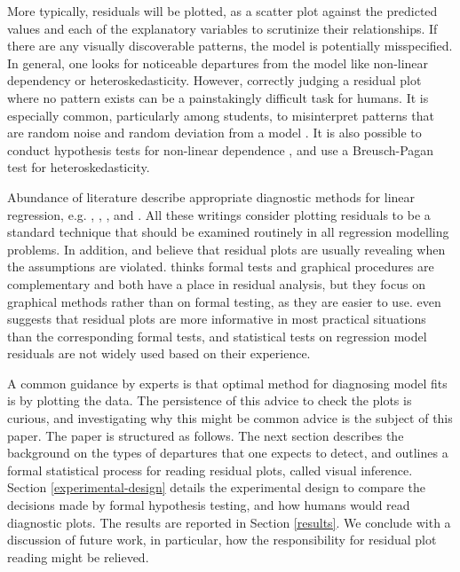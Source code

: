 \documentclass[]{interact}
\theoremstyle{plain}%
\theoremstyle{definition}
\theoremstyle{remark}
\begin{document}
More typically, residuals will be plotted, as a scatter plot against the
predicted values and each of the explanatory variables to scrutinize
their relationships. If there are any visually discoverable patterns,
the model is potentially misspecified. In general, one looks for
noticeable departures from the model like non-linear dependency or
heteroskedasticity. However, correctly judging a residual plot where no
pattern exists can be a painstakingly difficult task for humans. It is
especially common, particularly among students, to misinterpret patterns
that are random noise and random deviation from a model
\citep{loy2021bringing}. It is also possible to conduct hypothesis tests
for non-linear dependence \citep{ramsey_tests_1969}, and use a
Breusch-Pagan test \citep{breusch_simple_1979} for heteroskedasticity.

Abundance of literature describe appropriate diagnostic methods for
linear regression, e.g. \citet{draper1998applied},
\citet{montgomery1982introduction}, \citet{belsley_regression_1980},
\citet{cook_applied_1999} and \citet{cook1982residuals}. All these
writings consider plotting residuals to be a standard technique that
should be examined routinely in all regression modelling problems. In
addition, \citet{draper1998applied} and \citet{belsley_regression_1980}
believe that residual plots are usually revealing when the assumptions
are violated. \citet{cook_applied_1999} thinks formal tests and
graphical procedures are complementary and both have a place in residual
analysis, but they focus on graphical methods rather than on formal
testing, as they are easier to use. \citet{montgomery1982introduction}
even suggests that residual plots are more informative in most practical
situations than the corresponding formal tests, and statistical tests on
regression model residuals are not widely used based on their
experience.

A common guidance by experts is that optimal method for diagnosing model
fits is by plotting the data. The persistence of this advice to check
the plots is curious, and investigating why this might be common advice
is the subject of this paper. The paper is structured as follows. The
next section describes the background on the types of departures that
one expects to detect, and outlines a formal statistical process for
reading residual plots, called visual inference. Section
\ref{experimental-design} details the experimental design to compare the
decisions made by formal hypothesis testing, and how humans would read
diagnostic plots. The results are reported in Section \ref{results}. We
conclude with a discussion of future work, in particular, how the
responsibility for residual plot reading might be relieved.
\end{document}
